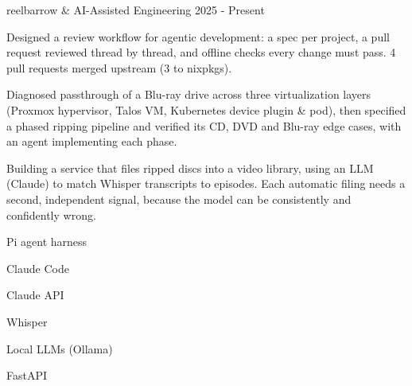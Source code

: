 
\begin{cventries}

  \cventry%
  {} %
  {reelbarrow \& AI-Assisted Engineering} %
  {} %
  {2025 \-- Present} %
  {%
    \begin{cvitems}
    \item {Designed a review workflow for agentic development: a spec per project, a pull request reviewed thread by thread, and offline checks every change must pass. 4 pull requests merged upstream (3 to nixpkgs).}
    \item {Diagnosed passthrough of a Blu-ray drive across three virtualization layers (Proxmox hypervisor, Talos VM, Kubernetes device plugin \& pod), then specified a phased ripping pipeline and verified its CD, DVD and Blu-ray edge cases, with an agent implementing each phase.}
    \item {Building a service that files ripped discs into a video library, using an LLM (Claude) to match Whisper transcripts to episodes. Each automatic filing needs a second, independent signal, because the model can be consistently and confidently wrong.}
    \end{cvitems}
  }
  \begin{cventryskills}
  \item Pi agent harness
  \item Claude Code
  \item Claude API
  \item Whisper
  \item Local LLMs (Ollama)
  \item FastAPI
  \end{cventryskills}


\end{cventries}
